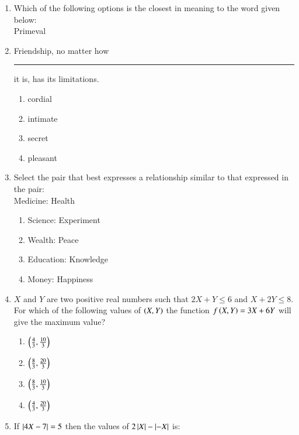 \documentclass[journal,12pt,onecolumn]{IEEEtran}
\theoremstyle{remark}
\begin{document}
\begin{enumerate}
\begin{enumerate}
\end{enumerate}
\item Which of the following options is the closest in meaning to the word given below:\\
Primeval
\begin{enumerate}
\end{enumerate}
\item Friendship, no matter how \rule{2cm}{0.15mm} it is, has its limitations.
\begin{enumerate}
\item cordial
\item intimate
\item secret
\item pleasant
\end{enumerate}
\item Select the pair that best expresses a relationship similar to that expressed in the pair:\\
Medicine: Health
\begin{enumerate}
\item Science: Experiment
\item Wealth: Peace
\item Education: Knowledge
\item Money: Happiness
\end{enumerate}
\item $X$ and $Y$ are two positive real numbers such that $2X + Y \leq 6$ and $X + 2Y \leq 8$. For which of the following values  of $\left(X,Y\right)$ the function $f\left(X,Y\right) = 3X + 6Y$ will give the maximum value?
\begin{enumerate}
\item $\left(\frac{4}{3},\frac{10}{3}\right)$
\item $\left(\frac{8}{3},\frac{20}{3}\right)$
\item $\left(\frac{8}{3},\frac{10}{3}\right)$
\item $\left(\frac{4}{3},\frac{20}{3}\right)$
\end{enumerate}
\item If $\left\vert4X-7\right\vert = 5$ then the values of $2\left\vert X\right\vert-\left\vert-X\right\vert$ is:

\end{enumerate}
\end{document}
